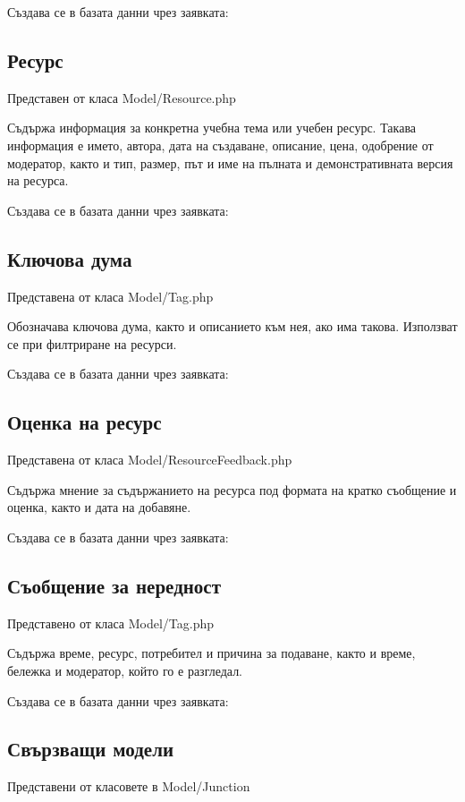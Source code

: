 Създава се в базата данни чрез заявката:


\subsection{Ресурс}
Представен от класа Model/Resource.php

Съдържа информация за конкретна учебна тема или учебен
ресурс. Такава информация е името, автора, дата на
създаване, описание, цена, одобрение от модератор, както
и тип, размер, път и име на пълната и
демонстративната версия на ресурса.

Създава се в базата данни чрез заявката:


\subsection{Ключова дума}
Представена от класа Model/Tag.php

Обозначава ключова дума, както и описанието към нея,
ако има такова. Използват се при филтриране на ресурси.

Създава се в базата данни чрез заявката:


\subsection{Оценка на ресурс}
Представена от класа Model/ResourceFeedback.php

Съдържа мнение за съдържанието на ресурса под формата
на кратко съобщение и оценка, както и дата на добавяне.

Създава се в базата данни чрез заявката:


\subsection{Съобщение за нередност}
Представено от класа Model/Tag.php

Съдържа време, ресурс, потребител и причина за подаване,
както и време, бележка и модератор, който го е разгледал.

Създава се в базата данни чрез заявката:


\subsection{Свързващи модели}
Представени от класовете в Model/Junction

